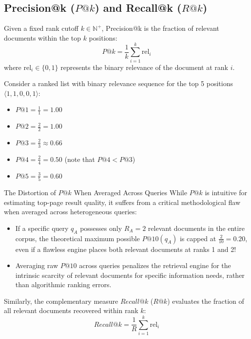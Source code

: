 \subsection{\texorpdfstring{Precision@k ($P@k$) and Recall@k ($R@k$)}{Precision@k and Recall@k}}
\begin{definition}[Precision@k]
Given a fixed rank cutoff $k \in \mathbb{N}^+$, Precision@k is the fraction of relevant documents within the top $k$ positions:
\begin{equation}
P@k = \frac{1}{k} \sum_{i=1}^k \mathrm{rel}_i
\end{equation}
where $\mathrm{rel}_i \in \{0, 1\}$ represents the binary relevance of the document at rank $i$.
\end{definition}

\begin{example}
Consider a ranked list with binary relevance sequence for the top 5 positions $\langle 1, 1, 0, 0, 1 \rangle$:
\begin{itemize}
    \item $P@1 = \frac{1}{1} = 1.00$
    \item $P@2 = \frac{2}{2} = 1.00$
    \item $P@3 = \frac{2}{3} \approx 0.66$
    \item $P@4 = \frac{2}{4} = 0.50$ (note that $P@4 < P@3$)
    \item $P@5 = \frac{3}{5} = 0.60$
\end{itemize}
\end{example}

\begin{alertblock}{The Distortion of $P@k$ When Averaged Across Queries}
While $P@k$ is intuitive for estimating top-page result quality, it suffers from a critical methodological flaw when averaged across heterogeneous queries:
\begin{itemize}
    \item If a specific query $q_A$ possesses only $R_A = 2$ relevant documents in the entire corpus, the theoretical maximum possible $P@10(q_A)$ is capped at $\frac{2}{10} = 0.20$, even if a flawless engine places both relevant documents at ranks 1 and 2!
    \item Averaging raw $P@10$ across queries penalizes the retrieval engine for the intrinsic scarcity of relevant documents for specific information needs, rather than algorithmic ranking errors.
\end{itemize}
Similarly, the complementary measure $Recall@k$ ($R@k$) evaluates the fraction of all relevant documents recovered within rank $k$:
\begin{equation}
Recall@k = \frac{1}{R} \sum_{i=1}^k \mathrm{rel}_i
\end{equation}
\end{alertblock}

